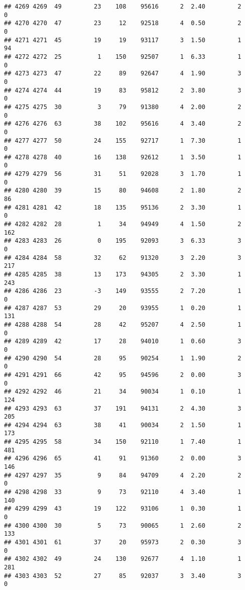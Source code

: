 \documentclass[
]{article}
\begin{document}
\begin{verbatim}
## 4269 4269  49         23    108    95616      2  2.40         2        0
## 4270 4270  47         23     12    92518      4  0.50         2        0
## 4271 4271  45         19     19    93117      3  1.50         1       94
## 4272 4272  25          1    150    92507      1  6.33         1        0
## 4273 4273  47         22     89    92647      4  1.90         3        0
## 4274 4274  44         19     83    95812      2  3.80         3        0
## 4275 4275  30          3     79    91380      4  2.00         2        0
## 4276 4276  63         38    102    95616      4  3.40         2        0
## 4277 4277  50         24    155    92717      1  7.30         1        0
## 4278 4278  40         16    138    92612      1  3.50         1        0
## 4279 4279  56         31     51    92028      3  1.70         1        0
## 4280 4280  39         15     80    94608      2  1.80         2       86
## 4281 4281  42         18    135    95136      2  3.30         1        0
## 4282 4282  28          1     34    94949      4  1.50         2      162
## 4283 4283  26          0    195    92093      3  6.33         3        0
## 4284 4284  58         32     62    91320      3  2.20         3      217
## 4285 4285  38         13    173    94305      2  3.30         1      243
## 4286 4286  23         -3    149    93555      2  7.20         1        0
## 4287 4287  53         29     20    93955      1  0.20         1      131
## 4288 4288  54         28     42    95207      4  2.50         1        0
## 4289 4289  42         17     28    94010      1  0.60         3        0
## 4290 4290  54         28     95    90254      1  1.90         2        0
## 4291 4291  66         42     95    94596      2  0.00         3        0
## 4292 4292  46         21     34    90034      1  0.10         1      124
## 4293 4293  63         37    191    94131      2  4.30         3      205
## 4294 4294  63         38     41    90034      2  1.50         1      173
## 4295 4295  58         34    150    92110      1  7.40         1      481
## 4296 4296  65         41     91    91360      2  0.00         3      146
## 4297 4297  35          9     84    94709      4  2.20         2        0
## 4298 4298  33          9     73    92110      4  3.40         1      140
## 4299 4299  43         19    122    93106      1  0.30         1        0
## 4300 4300  30          5     73    90065      1  2.60         2      133
## 4301 4301  61         37     20    95973      2  0.30         3        0
## 4302 4302  49         24    130    92677      4  1.10         1      281
## 4303 4303  52         27     85    92037      3  3.40         3        0

\end{verbatim}
\end{document}
